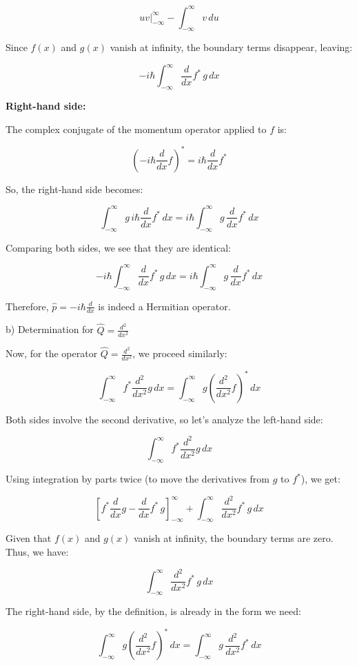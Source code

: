 \[ uv \Big|_{-\infty}^{\infty} - \int_{-\infty}^{\infty} v \, du \]

Since \(f(x)\) and \(g(x)\) vanish at infinity, the boundary terms disappear, leaving:

\[ -i\hbar \int_{-\infty}^{\infty} \frac{d}{dx}f^{*} \, g \, dx \]

\textbf{Right-hand side:}

The complex conjugate of the momentum operator applied to \(f\) is:

\[ \left( -i\hbar\frac{d}{dx}f \right)^{*} = i\hbar\frac{d}{dx}f^{*} \]

So, the right-hand side becomes:

\[ \int_{-\infty}^{\infty} g \, i\hbar\frac{d}{dx}f^{*} \, dx = i\hbar \int_{-\infty}^{\infty} g \, \frac{d}{dx}f^{*} \, dx \]

Comparing both sides, we see that they are identical:

\[ -i\hbar \int_{-\infty}^{\infty} \frac{d}{dx}f^{*} \, g \, dx = i\hbar \int_{-\infty}^{\infty} g \, \frac{d}{dx}f^{*} \, dx \]

Therefore, \( \hat{p} = -i\hbar\frac{d}{dx} \) is indeed a Hermitian operator.

b) Determination for \( \hat{Q} = \frac{d^{2}}{dx^{2}} \)

Now, for the operator \( \hat{Q} = \frac{d^{2}}{dx^{2}} \), we proceed similarly:

\[ \int_{-\infty}^{\infty} f^{*}\frac{d^{2}}{dx^{2}}g \, dx = \int_{-\infty}^{\infty} g\left(\frac{d^{2}}{dx^{2}}f\right)^{*} \, dx \]

Both sides involve the second derivative, so let's analyze the left-hand side:

\[ \int_{-\infty}^{\infty} f^{*}\frac{d^{2}}{dx^{2}}g \, dx \]

Using integration by parts twice (to move the derivatives from \(g\) to \(f^{*}\)), we get:

\[ \left[ f^{*}\frac{d}{dx}g - \frac{d}{dx}f^{*} \, g \right]_{-\infty}^{\infty} + \int_{-\infty}^{\infty} \frac{d^{2}}{dx^{2}}f^{*} \, g \, dx \]

Given that \(f(x)\) and \(g(x)\) vanish at infinity, the boundary terms are zero. Thus, we have:

\[ \int_{-\infty}^{\infty} \frac{d^{2}}{dx^{2}}f^{*} \, g \, dx \]

The right-hand side, by the definition, is already in the form we need:

\[ \int_{-\infty}^{\infty} g\left(\frac{d^{2}}{dx^{2}}f\right)^{*} \, dx = \int_{-\infty}^{\infty} g \, \frac{d^{2}}{dx^{2}}f^{*} \, dx \]

